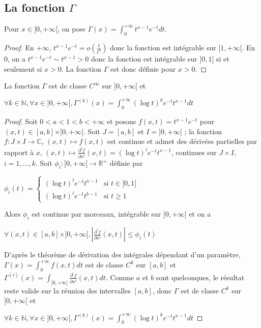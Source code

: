     \subsection{La fonction $\Gamma$}
    
    \begin{de}
    Pour $x \in ]0,+\infty[$, on pose $\Gamma(x) = \int_0^{+\infty} t^{x-1} e^{-t} dt$.
    \end{de}
    
    \begin{proof}
    En $+\infty$, $t^{x-1} e^{-t} = o(\frac{1}{t^2})$ donc la fonction est intégrable sur $[1,+\infty[$. En $0$, on a $t^{x-1} e^{-t} \sim t^{x-1} > 0$ donc la fonction est intégrable sur $]0,1]$ si et seulement si $x > 0$. La fonction $\Gamma$ est donc définie pour $x > 0$.
    \end{proof}
    
    \begin{prop}
    La fonction $\Gamma$ est de classe $C^\infty$ sur $]0,+\infty[$ et
    
    $\forall k \in \mathbb{N}, \forall x \in ]0,+\infty[, \Gamma^{(k)}(x) = \int_0^{+\infty} (\log t)^k e^{-t} t^{x-1} dt$
    \end{prop}
    
    \begin{proof}
    Soit $0 < a < 1 < b < +\infty$ et posons $f(x,t) = t^{x-1} e^{-t}$ pour $(x,t) \in [a,b] \times ]0,+\infty[$. Soit $J = [a,b]$ et $I = ]0,+\infty[$ ; la fonction $f : J \times I \to \mathbb{C}$, $(x,t) \mapsto f(x,t)$ est continue et admet des dérivées partielles par rapport à $x$, $(x,t) \mapsto \frac{\partial^i f}{\partial x^i}(x,t) = (\log t)^i e^{-t} t^{x-1}$, continues sur $J \times I$, $i = 1,\ldots,k$. Soit $\phi_i : ]0,+\infty[ \to \mathbb{R}^+$ définie par
    
    $\phi_i(t) = \begin{cases}
    (\log t)^i e^{-t} t^{a-1} &\text{si } t \in ]0,1] \\
    (\log t)^i e^{-t} t^{b-1} &\text{si } t \geq 1
    \end{cases}$
    
    Alors $\phi_i$ est continue par morceaux, intégrable sur $]0,+\infty[$ et on a
    
    $\forall (x,t) \in [a,b] \times ]0,+\infty[, |\frac{\partial^i f}{\partial x^i}(x,t)| \leq \phi_i(t)$
    
    D'après le théorème de dérivation des intégrales dépendant d'un paramètre, $\Gamma(x) = \int_0^{+\infty} f(x,t) dt$ est de classe $C^k$ sur $[a,b]$ et $\Gamma^{(i)}(x) = \int_{]0,+\infty[} \frac{\partial^i f}{\partial x^i}(x,t) dt$. Comme $a$ et $b$ sont quelconques, le résultat reste valide sur la réunion des intervalles $[a,b]$, donc $\Gamma$ est de classe $C^k$ sur $]0,+\infty[$ et
    
    $\forall k \in \mathbb{N}, \forall x \in ]0,+\infty[, \Gamma^{(k)}(x) = \int_0^{+\infty} (\log t)^k e^{-t} t^{x-1} dt$
    \end{proof}
    

